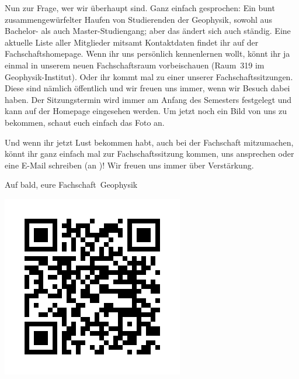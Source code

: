 \begin{multicols*}{2}
Nun zur Frage, wer wir überhaupt sind.
Ganz einfach gesprochen:
Ein bunt zusammengewürfelter Haufen von Studierenden der Geophysik, sowohl aus Bachelor- als auch Master-Studiengang; aber das ändert sich auch ständig.
Eine aktuelle Liste aller Mitglieder mitsamt Kontaktdaten findet ihr auf der Fachschaftshomepage.
Wenn ihr uns persönlich kennenlernen wollt, könnt ihr ja einmal in unserem neuen Fachschaftsraum vorbeischauen (Raum~319 im Geophysik-Institut).
Oder ihr kommt mal zu einer unserer Fachschaftssitzungen.
Diese sind nämlich öffentlich und wir freuen uns immer, wenn wir Besuch dabei haben.
Der Sitzungstermin wird immer am Anfang des Semesters festgelegt und kann auf der Homepage eingesehen werden.
Um jetzt noch ein Bild von uns zu bekommen, schaut euch einfach das Foto an.

Und wenn ihr jetzt Lust bekommen habt, auch bei der Fachschaft mitzumachen, könnt ihr ganz einfach mal zur Fachschaftssitzung kommen, uns ansprechen oder eine E-Mail schreiben (an )!
Wir freuen uns immer über Verstärkung.

Auf bald, eure Fachschaft~Geophysik

\begin{center}
	\includegraphics[width=0.55\columnwidth]{res/FS_Geophysik_QR_Insta2025.png}
\end{center}
\end{multicols*}

